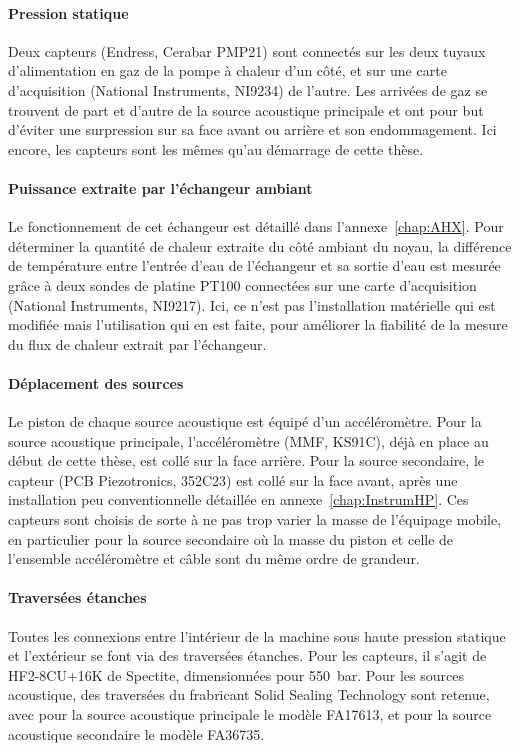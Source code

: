 \paragraph{Pression statique} Deux capteurs (Endress, Cerabar PMP21) sont connectés sur les deux tuyaux d'alimentation en gaz de la pompe  à chaleur d'un côté, et sur une carte d'acquisition (National Instruments, NI9234) de l'autre. Les arrivées de gaz se trouvent de part et d'autre de la source acoustique principale et ont pour but d'éviter une surpression sur sa face avant ou arrière et son endommagement. Ici encore, les capteurs sont les mêmes qu'au démarrage de cette thèse.

\paragraph{Puissance extraite par l'échangeur ambiant} Le fonctionnement de cet échangeur est détaillé dans l'annexe~\ref{chap:AHX}. Pour déterminer la quantité de chaleur extraite du côté ambiant du noyau, la différence de température entre l'entrée d'eau de l'échangeur et sa sortie d'eau est mesurée grâce à deux sondes de platine PT100 connectées sur une carte d'acquisition (National Instruments, NI9217). Ici, ce n'est pas l'installation matérielle qui est modifiée mais l'utilisation qui en est faite, pour améliorer la fiabilité de la mesure du flux de chaleur extrait par l'échangeur.

\paragraph{Déplacement des sources} Le piston de chaque source acoustique est équipé d'un accéléromètre. Pour la source acoustique principale, l'accéléromètre (MMF, KS91C), déjà en place au début de cette thèse, est collé sur la face arrière. Pour la source secondaire, le capteur (PCB Piezotronics, 352C23) est collé sur la face avant, après une installation peu conventionnelle détaillée en annexe~\ref{chap:InstrumHP}. Ces capteurs sont choisis de sorte à ne pas trop varier la masse de l'équipage mobile, en particulier pour la source secondaire où la masse du piston et celle de l'ensemble accéléromètre et câble sont du même ordre de grandeur.

\paragraph{Traversées étanches} Toutes les connexions entre l'intérieur de la machine sous haute pression statique et l'extérieur se font via des traversées étanches. Pour les capteurs, il s'agit de HF2-8CU+16K de Spectite, dimensionnées pour \qty{550}{\bar}. Pour les sources acoustique, des traversées du frabricant Solid Sealing Technology sont retenue, avec pour la source acoustique principale le modèle FA17613, et pour la source acoustique secondaire le modèle FA36735. 

